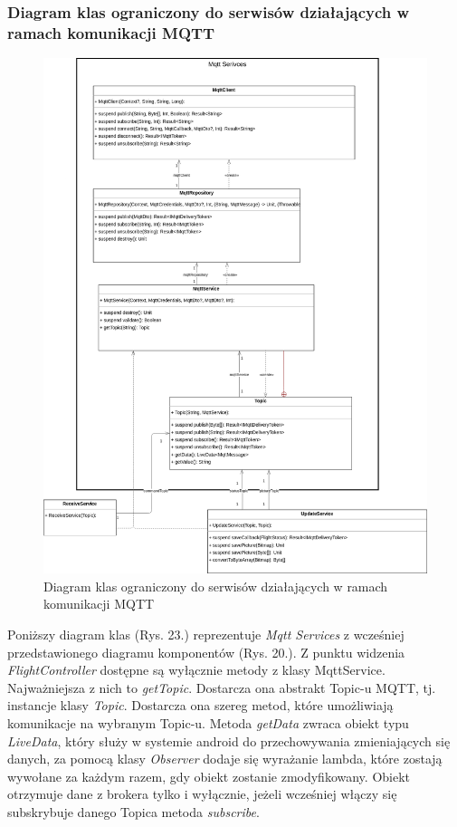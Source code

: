 \newpage

\subsubsection{Diagram klas ograniczony do serwisów działających w ramach komunikacji MQTT}

\begin{figure}[!htp]
\begin{center}
  \includegraphics[width=16cm]{./Obrazy/services.png}
  \caption{Diagram klas ograniczony do serwisów działających w ramach komunikacji MQTT}
\end{center}
\end{figure}

  Poniższy diagram klas (Rys. 23.) reprezentuje \textit{Mqtt Services} z wcześniej przedstawionego diagramu komponentów (Rys. 20.). Z punktu widzenia \textit{FlightController} dostępne są wyłącznie metody z klasy MqttService. Najważniejsza z nich to \textit{getTopic}. Dostarcza ona abstrakt Topic-u MQTT, tj. instancje klasy \textit{Topic}. Dostarcza ona szereg metod, które umożliwiają komunikacje na wybranym Topic-u. Metoda \textit{getData} zwraca obiekt typu \textit{LiveData}, który służy w systemie android do przechowywania zmieniających się danych, za pomocą klasy \textit{Observer} dodaje się wyrażanie lambda, które zostają wywołane za każdym razem, gdy obiekt zostanie zmodyfikowany. Obiekt otrzymuje dane z brokera tylko i wyłącznie, jeżeli wcześniej włączy się subskrybuje danego Topica metoda \textit{subscribe}.

